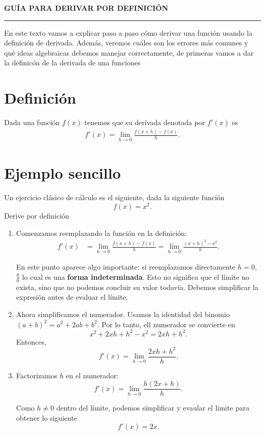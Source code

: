 \documentclass{article}
\author{Joan Sanchez}
\begin{document}
\begin{center}
    \textbf{GUÍA PARA DERIVAR POR DEFINICIÓN}
        \vspace{0.2cm}
    \rule{0.8\textwidth}{0.8pt}
\end{center}
En este texto vamos a explicar paso a paso cómo derivar una función usando la definición de derivada. Además, veremos cuáles son los errores más comunes y qué ideas algebraicas debemos manejar correctamente, de primeras vamos a dar la definicón de la derivada de una funciones
\section*{Definición}
Dada una función $f(x)$ tenemos que su derívada denotada por $f'(x)$ es
\begin{align*}
    f'(x) = \lim_{h \rightarrow 0} \frac{f(x+h)-f(x)}{h}.
\end{align*}
\section*{Ejemplo sencillo}
Un ejercicio clásico de cálculo es el siguiente, dada la siguiente función
\[
f(x)=x^2.
\]
Derive por definición
\begin{enumerate}
    \item Comenzamos reemplazando la función en la definición:
\begin{align*}
f'(x)&=\lim_{h\to0}\frac{f(x+h)-f(x)}{h}=\lim_{h\to0}\frac{(x+h)^2-x^2}{h}.
\end{align*}

En este punto aparece algo importante: si reemplazamos directamente \(h=0\), $\frac{0}{0}$ lo cual es una \textbf{forma indeterminada}. Esto no significa que el límite no exista, sino que no podemos concluir su valor todavía. Debemos simplificar la expresión antes de evaluar el límite.

\item Ahora simplificamos el numerador.
Usamos la identidad del binomio $(a+b)^2=a^2+2ab+b^2$.
Por lo tanto, ell numerador se convierte en
\[
x^2+2xh+h^2-x^2=
2xh+h^2.
\]
Entonces,
\[
f'(x)=\lim_{h\to0}\frac{2xh+h^2}{h}.
\]

\item Factorizamos \(h\) en el numerador:
\[
f'(x)=\lim_{h\to 0}\frac{h(2x+h)}{h}.
\]

Como \(h\neq0\) dentro del límite, podemos simplificar y evaular el limite para obtener lo siguiente
\[
f'(x)=2x.
\]
\end{enumerate}
\end{document}
